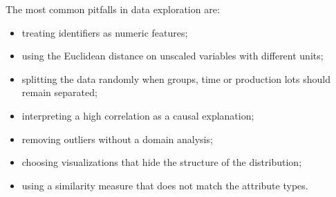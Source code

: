 The most common pitfalls in data exploration are:
\begin{itemize}
    \item treating identifiers as numeric features;
    \item using the Euclidean distance on unscaled variables with different units;
    \item splitting the data randomly when groups, time or production lots should remain separated;
    \item interpreting a high correlation as a causal explanation;
    \item removing outliers without a domain analysis;
    \item choosing visualizations that hide the structure of the distribution;
    \item using a similarity measure that does not match the attribute types.
\end{itemize}